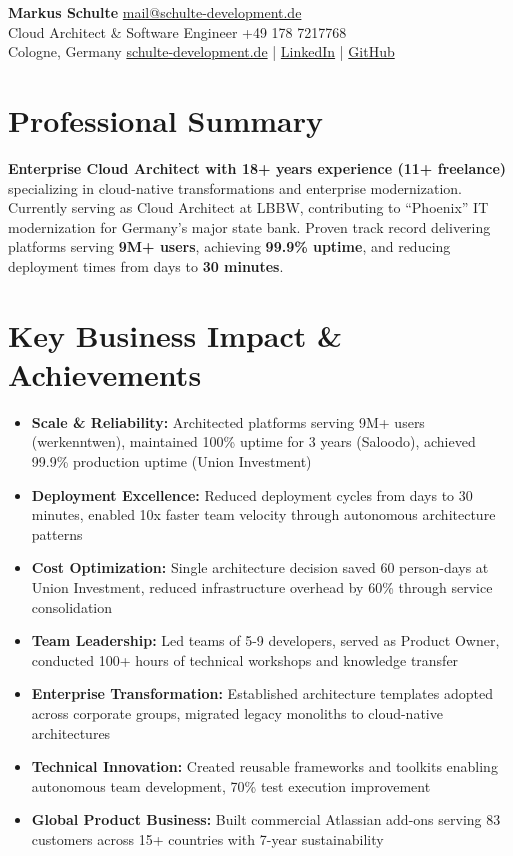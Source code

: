 \documentclass[10pt,a4paper]{article}
\begin{document}
{\LARGE\bfseries\sffamily Markus Schulte} \hfill \href{mailto:mail@schulte-development.de}{mail@schulte-development.de}\\
{\large\sffamily Cloud Architect \& Software Engineer} \hfill +49 178 7217768\\
{\small\sffamily Cologne, Germany} \hfill \href{https://schulte-development.de}{schulte-development.de} | \href{https://linkedin.com/in/markus-schulte/}{LinkedIn} | \href{https://github.com/SchulteDev}{GitHub}

\vspace{4pt}

\section*{Professional Summary}

\textbf{Enterprise Cloud Architect with 18+ years experience (11+ freelance)} specializing in cloud-native transformations and enterprise modernization. Currently serving as Cloud Architect at LBBW, contributing to ``Phoenix'' IT modernization for Germany's major state bank. Proven track record delivering platforms serving \textbf{9M+ users}, achieving \textbf{99.9\% uptime}, and reducing deployment times from days to \textbf{30 minutes}.

\vspace{3pt}

\section*{Key Business Impact \& Achievements}

\begin{itemize}[leftmargin=*]
\item \textbf{Scale \& Reliability:} Architected platforms serving 9M+ users (werkenntwen), maintained 100\% uptime for 3 years (Saloodo), achieved 99.9\% production uptime (Union Investment)
\item \textbf{Deployment Excellence:} Reduced deployment cycles from days to 30 minutes, enabled 10x faster team velocity through autonomous architecture patterns
\item \textbf{Cost Optimization:} Single architecture decision saved 60 person-days at Union Investment, reduced infrastructure overhead by 60\% through service consolidation
\item \textbf{Team Leadership:} Led teams of 5-9 developers, served as Product Owner, conducted 100+ hours of technical workshops and knowledge transfer
\item \textbf{Enterprise Transformation:} Established architecture templates adopted across corporate groups, migrated legacy monoliths to cloud-native architectures
\item \textbf{Technical Innovation:} Created reusable frameworks and toolkits enabling autonomous team development, 70\% test execution improvement
\item \textbf{Global Product Business:} Built commercial Atlassian add-ons serving 83 customers across 15+ countries with 7-year sustainability
\end{itemize}
\end{document}
